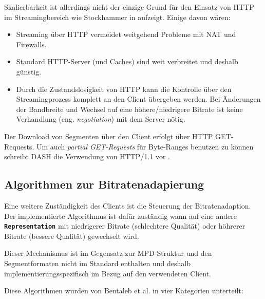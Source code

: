 \documentclass[paper = a4, fontsize = 12pt, parskip = half]{scrartcl} %
\def\elem#1{\texttt{\textbf{#1}}}
\begin{document}
Skalierbarkeit ist allerdings nicht der einzige Grund für den Einsatz von HTTP im Streamingbereich wie Stockhammer in \cite{stockhammer_dynamic_2011} aufzeigt. Einige davon wären: 

\begin{itemize}
	\item Streaming über HTTP vermeidet weitgehend Probleme mit NAT und Firewalls.
	\item Standard HTTP-Server (und Caches) sind weit verbreitet und deshalb günstig.
	\item Durch die Zustandslosigkeit von HTTP kann die Kontrolle über den Streamingprozess komplett an den Client übergeben werden. Bei Änderungen der Bandbreite und Wechsel auf eine höhere/niedrigere Bitrate ist keine Verhandlung (eng. \textit{negotiation}) mit dem Server nötig.
\end{itemize}

Der Download von Segmenten über den Client erfolgt über HTTP GET-Requests. Um auch \textit{partial GET-Requests} für Byte-Ranges benutzen zu können schreibt DASH die Verwendung von HTTP/1.1 vor \cite{international_organization_for_standardization_isoiec_nodate}.

\subsection{Algorithmen zur Bitratenadapierung}
Eine weitere Zuständigkeit des Clients ist die Steuerung der Bitratenadaption. Der implementierte Algorithmus ist dafür zuständig wann auf eine andere \elem{Representation} mit niedrigerer Bitrate (schlechtere Qualität) oder höhrerer Bitrate (bessere Qualität) gewechselt wird.

Dieser Mechanismus ist im Gegensatz zur MPD-Struktur und den Segmentformaten nicht im Standard enthalten und deshalb implementierungsspezifisch im Bezug auf den verwendeten Client.

Diese Algorithmen wurden von Bentaleb et al. \cite{bentaleb_survey_2019} in vier Kategorien unterteilt:
\end{document}
